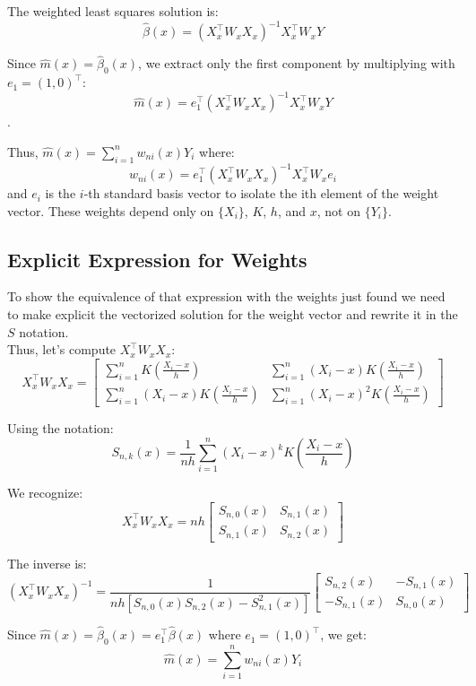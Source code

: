 \documentclass{article}
\begin{document}
\noindent The weighted least squares solution is:
\[
\hat{\beta}(x) = (X_x^\top W_x X_x)^{-1} X_x^\top W_x Y
\]

\noindent Since $\hat{m}(x) = \hat{\beta}_0(x)$, we extract only the first component by multiplying with $e_1 = (1, 0)^\top$:
\[
\hat{m}(x) = e_1^\top (X_x^\top W_x X_x)^{-1} X_x^\top W_x Y
\].

\noindent Thus, $\hat{m}(x) = \sum_{i=1}^n w_{ni}(x) Y_i$ where:
\[
w_{ni}(x) = e_1^\top (X_x^\top W_x X_x)^{-1} X_x^\top W_x e_i
\]
and $e_i$ is the $i$-th standard basis vector to isolate the ith element of the weight vector. These weights depend only on $\{X_i\}$, $K$, $h$, and $x$, not on $\{Y_i\}$.

\subsection{Explicit Expression for Weights}
To show the equivalence of that expression with the weights just found we need to 
make explicit the vectorized solution for the weight vector and rewrite it in the $S$ notation.\\
Thus, let's compute $X_x^\top W_x X_x$:
\[
X_x^\top W_x X_x = \begin{bmatrix}
\sum_{i=1}^n K\left(\frac{X_i-x}{h}\right) & \sum_{i=1}^n (X_i-x)K\left(\frac{X_i-x}{h}\right) \\
\sum_{i=1}^n (X_i-x)K\left(\frac{X_i-x}{h}\right) & \sum_{i=1}^n (X_i-x)^2 K\left(\frac{X_i-x}{h}\right)
\end{bmatrix}
\]

\noindent Using the notation:
\[
S_{n,k}(x) = \frac{1}{nh}\sum_{i=1}^n (X_i - x)^k K\left(\frac{X_i - x}{h}\right)
\]

\noindent We recognize:
\[
X_x^\top W_x X_x = nh \begin{bmatrix} S_{n,0}(x) & S_{n,1}(x) \\ S_{n,1}(x) & S_{n,2}(x) \end{bmatrix}
\]

\noindent The inverse is:
\[
(X_x^\top W_x X_x)^{-1} = \frac{1}{nh[S_{n,0}(x)S_{n,2}(x) - S_{n,1}^2(x)]} \begin{bmatrix} S_{n,2}(x) & -S_{n,1}(x) \\ -S_{n,1}(x) & S_{n,0}(x) \end{bmatrix}
\]

\noindent Since $\hat{m}(x) = \hat{\beta}_0(x) = e_1^\top \hat{\beta}(x)$ where $e_1 = (1, 0)^\top$, we get:
\[
\hat{m}(x) = \sum_{i=1}^n w_{ni}(x) Y_i
\]
\end{document}
